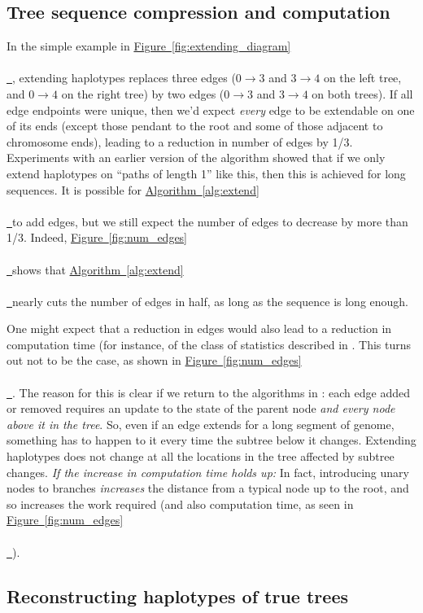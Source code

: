 \documentclass[10pt,twoside,lineno]{gsajnl}
\newcommand{\comment}[1]{{\color{violet} \it #1}}
\newcommand{\algorithmref}[2][]{%
	\hyperref[{#2}]{%
		Algorithm~\ref*{#2}%
		\ifx\\#1\\%
		\else
		\,#1%
		\fi
	}%
}
\newcommand*{\figref}[2][]{%
	\hyperref[{#2}]{%
		Figure~\ref*{#2}%
		\ifx\\#1\\%
		\else
		\,#1%
		\fi
	}%
}
\begin{document}
\subsection{Tree sequence compression and computation}

In the simple example in \figref{fig:extending_diagram},
extending haplotypes replaces three edges
($0 \to 3$ and $3 \to 4$ on the left tree, and $0 \to 4$ on the right tree)
by two edges ($0 \to 3$ and $3 \to 4$ on both trees).
If all edge endpoints were unique, then we'd expect \emph{every} edge to be extendable
on one of its ends
(except those pendant to the root and some of those adjacent to chromosome ends),
leading to a reduction in number of edges by 1/3.
Experiments with an earlier version of the algorithm showed that
if we only extend haplotypes on ``paths of length 1'' like this, 
then this is achieved for long sequences.
It is possible for \algorithmref{alg:extend} to add edges,
but we still expect the number of edges to decrease by more than 1/3.
Indeed,
\figref{fig:num_edges} shows that \algorithmref{alg:extend} nearly cuts the number of edges
in half, as long as the sequence is long enough.

One might expect that a reduction in edges would also lead to a reduction in computation time
(for instance, of the class of statistics described in \citet{ralph2020efficiently}.
This turns out not to be the case, as shown in \figref{fig:num_edges}.
The reason for this is clear if we
return to the algorithms in \citet{ralph2020efficiently}:
each edge added or removed requires an update
to the state of the parent node \emph{and every node above it in the tree}.
So, even if an edge extends for a long segment of genome,
something has to happen to it every time the subtree below it changes.
Extending haplotypes does not change at all the locations in the tree affected by subtree changes.
\comment{If the increase in computation time holds up:}
In fact, introducing unary nodes to branches
\emph{increases} the distance from a typical node up to the root,
and so increases the work required (and also computation time, as seen in \figref{fig:num_edges}).


\subsection{Reconstructing haplotypes of true trees}
\end{document}
